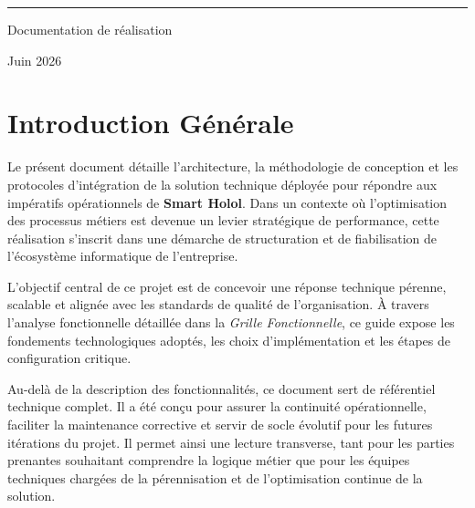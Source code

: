 \documentclass[12pt,a4paper]{report}
\begin{document}
\begin{titlepage}
\begin{center}
\begin{tabular}{|p{6cm}|p{6cm}|}
\hline

\end{tabular}

\vfill

\rule{\textwidth}{0.6pt}

\vspace{0.5cm}

{\large Documentation de réalisation}

\vspace{0.3cm}

{\large Juin 2026}

\end{center}

\end{titlepage}

\tableofcontents
\newpage

\chapter*{Introduction Générale}

Le présent document détaille l'architecture, la méthodologie de conception et les protocoles d'intégration de la solution technique déployée pour répondre aux impératifs opérationnels de \textbf{Smart Holol}. Dans un contexte où l'optimisation des processus métiers est devenue un levier stratégique de performance, cette réalisation s'inscrit dans une démarche de structuration et de fiabilisation de l'écosystème informatique de l'entreprise.

L'objectif central de ce projet est de concevoir une réponse technique pérenne, scalable et alignée avec les standards de qualité de l'organisation. À travers l'analyse fonctionnelle détaillée dans la \textit{Grille Fonctionnelle}, ce guide expose les fondements technologiques adoptés, les choix d'implémentation et les étapes de configuration critique. 

Au-delà de la description des fonctionnalités, ce document sert de référentiel technique complet. Il a été conçu pour assurer la continuité opérationnelle, faciliter la maintenance corrective et servir de socle évolutif pour les futures itérations du projet. Il permet ainsi une lecture transverse, tant pour les parties prenantes souhaitant comprendre la logique métier que pour les équipes techniques chargées de la pérennisation et de l'optimisation continue de la solution.
\end{document}
